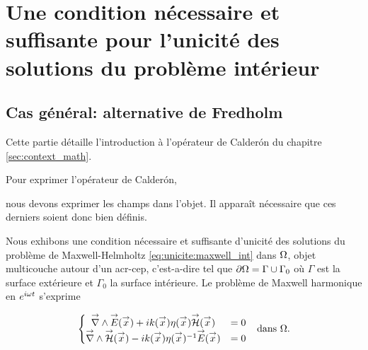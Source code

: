 \section[Une CNS pour l'unicité des solutions de Maxwell intérieur]{Une condition nécessaire et suffisante pour l'unicité des solutions du problème intérieur}
  \subsection{Cas général: alternative de Fredholm}

    Cette partie détaille l'introduction à l'opérateur de Calderón du chapitre \ref{sec:context_math}.


    Pour exprimer l'opérateur de Calderón,

    nous devons exprimer les champs dans l'objet. Il apparaît nécessaire que ces derniers soient donc bien définis.

    Nous exhibons une condition nécessaire et suffisante d'unicité des solutions du problème de Maxwell-Helmholtz  \eqref{eq:unicite:maxwell_int} dans \(\Omega\), objet multicouche autour d'un \gls{acr-cep}, c'est-a-dire tel que \(\partial \Omega = \Gamma \cup \Gamma_0\) où \(\Gamma\) est la surface extérieure et \(\Gamma_0\) la surface intérieure. Le problème de Maxwell harmonique en \(e^{i\omega t}\) s'exprime

    \begin{align}
    \left\lbrace
      \begin{matrix}
        {\overset{\rightarrow}{\nabla}}\wedge {\overset{\rightarrow}{E}}({\overset{\rightarrow}{x}}) + i k({\overset{\rightarrow}{x}})\eta({\overset{\rightarrow}{x}}) {\overset{\rightarrow}{\mathcal{H}}}({\overset{\rightarrow}{x}}) &= 0
        \\
        {\overset{\rightarrow}{\nabla}}\wedge {\overset{\rightarrow}{\mathcal{H}}}({\overset{\rightarrow}{x}}) - i k({\overset{\rightarrow}{x}})\eta({\overset{\rightarrow}{x}})^{-1} {\overset{\rightarrow}{E}}({\overset{\rightarrow}{x}}) &= 0
      \end{matrix}
      \right. && \text{dans \(\Omega\).}
      \label{eq:unicite:maxwell_int}
    \end{align}

